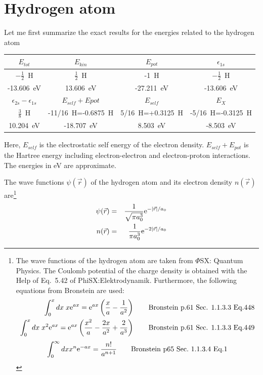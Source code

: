 \documentclass[11pt,a4paper]{report}
\begin{document}
\section{Hydrogen atom}
\label{sec:exacthatom}
Let me first summarize the exact results for the energies related to
the hydrogen atom
\begin{center}
\begin{tabular}{|c|c|c|c|}
\hline
\hline
$E_{tot}$         & $E_{kin}$       & $E_{pot}$ & $\epsilon_{1s}$  \\
\hline
$-\frac{1}{2}$~H & $\frac{1}{2}$~H & -1~H     & $-\frac{1}{2}$~H \\
-13.606~eV & 13.606~eV & -27.211~eV & -13.606~eV \\
\hline
\hline
 $\epsilon_{2s}-\epsilon_{1s}$ & $E_{self}+E{pot}$ & $E_{self}$ & $E_X$ \\
\hline
 $\frac{3}{8}$~H              & -11/16~H=-0.6875~H & 5/16~H=+0.3125~H & -5/16~H=-0.3125~H\\
 10.204~eV & -18.707~eV & 8.503~eV &-8.503~eV\\
\hline
\hline
\end{tabular}
\end{center}
Here, $E_{self}$ is the electrostatic self energy of the electron
density. $E_{self}+E_{pot}$ is the Hartree energy including
electron-electron and electron-proton interactions. The energies in eV
are approximate.


The wave functions $\psi(\vec{r})$ of the hydrogen atom and its
electron density $n(\vec{r})$ are\footnote{The wave functions of the
  hydrogen atom are taken from $\Phi$SX: Quantum Physics. The Coulomb
  potential of the charge density is obtained with the Help of
  Eq.~5.42 of PhiSX:Elektrodynamik. Furthermore, the following
  equations from Bronstein are used:
\begin{eqnarray}
\int_0^x dx\; x\mathrm{e}^{ax}= \mathrm{e}^{ax}\left(\frac{x}{a}-\frac{1}{a^2}\right)
\qquad\text{Bronstein p.61 Sec. 1.1.3.3 Eq.448} \nonumber\\ \int_0^x
dx\; x^2\mathrm{e}^{ax}=
\mathrm{e}^{ax}\left(\frac{x^2}{a}-\frac{2x}{a^2}+\frac{2}{a^3}\right)
\qquad\text{Bronstein p.61 Sec. 1.1.3.3 Eq.449}
\end{eqnarray}
\begin{eqnarray}
\int_0^\infty dx x^n\mathrm{e}^{-ax}=\frac{n!}{a^{n+1}} \qquad\text{Bronstein p65 Sec.~1.1.3.4 Eq.1}
\end{eqnarray}
} 
\begin{eqnarray}
\psi(\vec{r})&=&\frac{1}{\sqrt{\pi a_0^3}}\mathrm{e}^{-|\vec{r}|/a_0}
\nonumber\\
n(\vec{r})&=&\frac{1}{\pi a_0^3}\mathrm{e}^{-2|\vec{r}|/a_0}
\end{eqnarray}
\end{document}
